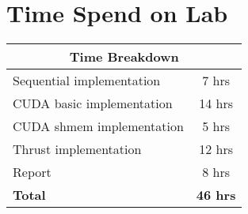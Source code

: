 \documentclass{article}
\begin{document}
\section{Time Spend on Lab}

\begin{center}
  \begin{tabular}{|l|c|}
    \hline
    \multicolumn{2}{|c|}{\bf Time Breakdown} \\ \hline
    Sequential implementation & 7 hrs       \\ \hline
    CUDA basic implementation & 14 hrs      \\ \hline
    CUDA shmem implementation & 5 hrs       \\ \hline
    Thrust implementation & 12 hrs          \\ \hline
    Report & 8 hrs                          \\ \hline
    \bf{Total} & \bf{46 hrs}                \\ \hline
  \end{tabular}
\end{center}
\end{document}
